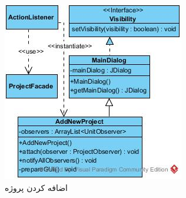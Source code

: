 \begin{landscape}
\begin{figure}[H]
	\includegraphics[scale=0.6]{img/sequence-design/AddProjectToOrganizationUI}
	\caption{اضافه کردن پروژه}
\end{figure}


\newpage

\end{landscape}
